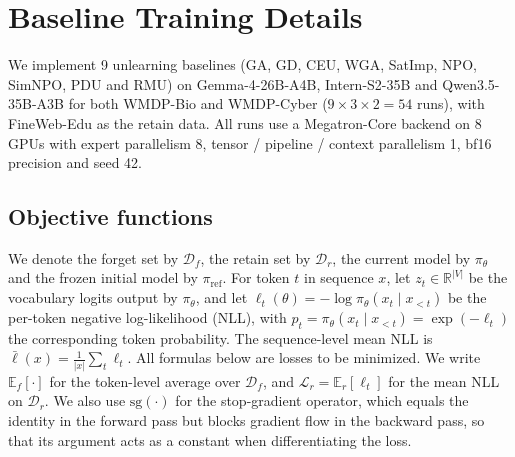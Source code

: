 \section{Baseline Training Details}
\label{app:baseline-details}

We implement 9 unlearning baselines (GA, GD, CEU, WGA, SatImp, NPO, SimNPO, PDU and RMU) on Gemma-4-26B-A4B, Intern-S2-35B and Qwen3.5-35B-A3B for both WMDP-Bio and WMDP-Cyber ($9 \times 3 \times 2 = 54$ runs), with FineWeb-Edu as the retain data. All runs use a Megatron-Core backend on 8 GPUs with expert parallelism 8, tensor / pipeline / context parallelism 1, bf16 precision and seed 42.

\subsection{Objective functions}
\label{app:baseline-objectives}

We denote the forget set by $\mathcal{D}_f$, the retain set by $\mathcal{D}_r$, the current model by $\pi_\theta$ and the frozen initial model by $\pi_{\mathrm{ref}}$. For token $t$ in sequence $x$, let $z_t \in \mathbb{R}^{|V|}$ be the vocabulary logits output by $\pi_\theta$, and let $\ell_t(\theta) = -\log \pi_\theta(x_t \mid x_{<t})$ be the per-token negative log-likelihood (NLL), with $p_t = \pi_\theta(x_t \mid x_{<t}) = \exp(-\ell_t)$ the corresponding token probability. The sequence-level mean NLL is $\bar\ell(x) = \frac{1}{|x|}\sum_t \ell_t$. All formulas below are losses to be minimized. We write $\mathbb{E}_f[\cdot]$ for the token-level average over $\mathcal{D}_f$, and $\mathcal{L}_r = \mathbb{E}_r[\ell_t]$ for the mean NLL on $\mathcal{D}_r$. We also use $\mathrm{sg}(\cdot)$ for the stop-gradient operator, which equals the identity in the forward pass but blocks gradient flow in the backward pass, so that its argument acts as a constant when differentiating the loss.

